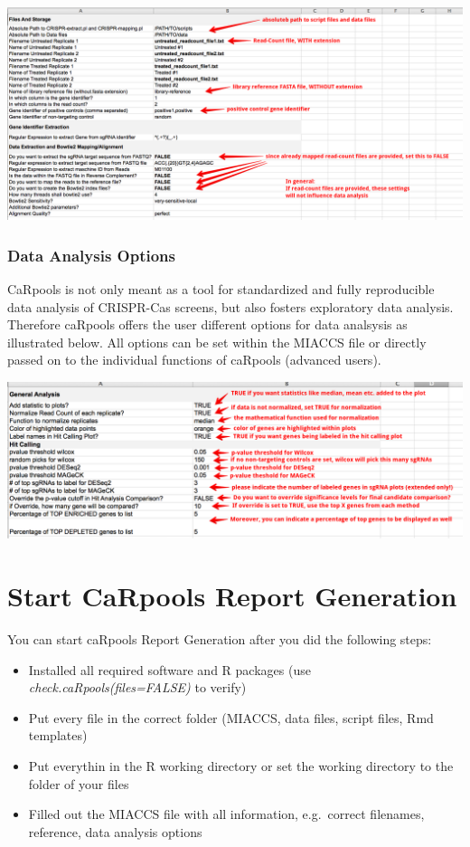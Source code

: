\documentclass[]{article}
\providecommand{\tightlist}{%
  \setlength{\itemsep}{0pt}\setlength{\parskip}{0pt}}
\begin{document}
\includegraphics{./pictures/miaccs-readcount.png}

\subsubsection{Data Analysis Options}\label{data-analysis-options}

CaRpools is not only meant as a tool for standardized and fully
reproducible data analysis of CRISPR-Cas screens, but also fosters
exploratory data analysis.\\
Therefore caRpools offers the user different options for data analsysis
as illustrated below. All options can be set within the MIACCS file or
directly passed on to the individual functions of caRpools (advanced
users).

\includegraphics{./pictures/miaccs-analysis.png}

\section{Start CaRpools Report
Generation}\label{start-carpools-report-generation}

You can start caRpools Report Generation after you did the following
steps:

\begin{itemize}
\tightlist
\item
  Installed all required software and R packages (use
  \emph{check.caRpools(files=FALSE)} to verify)
\item
  Put every file in the correct folder (MIACCS, data files, script
  files, Rmd templates)
\item
  Put everythin in the R working directory or set the working directory
  to the folder of your files
\item
  Filled out the MIACCS file with all information, e.g.~correct
  filenames, reference, data analysis options
\end{itemize}
\end{document}
